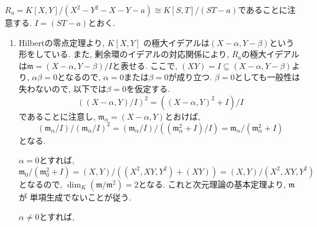 \documentclass[dvipdfmx]{jsarticle}
\begin{document}
    $R_a = K[X, Y]/ (X^2-Y^2-X-Y-a) \cong K[S,T]/(ST-a)$であることに注意する.
    $I = (ST-a)$とおく.
    \begin{enumerate}
        \item Hilbertの零点定理より, $K[X, Y]$
        の極大イデアルは$(X-\alpha, Y-\beta)$という形をしている.
        また, 剰余環のイデアルの対応関係により,
        $R_a$の極大イデアルは$\mathfrak{m} = (X-\alpha, Y-\beta)/I$と表せる.
        ここで, $(XY) = I \subseteq (X-\alpha, Y-\beta)$より,
        $\alpha\beta = 0$となるので, $\alpha = 0$または$\beta = 0$が成り立つ.
        $\beta = 0$としても一般性は失わないので, 以下では$\beta = 0$を仮定する.
        \[
            ((X-\alpha, Y)/I)^2 = ((X-\alpha, Y)^2 + I)/I
        \]
        であることに注意し, $\mathfrak{m}_\alpha = (X-\alpha, Y)$とおけば,
        \[
            (\mathfrak{m}_\alpha/I)/(\mathfrak{m}_\alpha/I)^2 = (\mathfrak{m}_\alpha/I)/((\mathfrak{m}_\alpha^2+I)/I) = \mathfrak{m}_\alpha/(\mathfrak{m}_\alpha^2 + I)
        \]
        となる.

        $\alpha = 0$とすれば,
        \[
            \mathfrak{m}_0/(\mathfrak{m}_0^2 + I) = (X,Y)/((X^2, XY, Y^2) + (XY)) = (X,Y)/(X^2, XY, Y^2)
        \]
        となるので, $\dim_K(\mathfrak{m}/\mathfrak{m}^2) = 2$となる.
        これと次元理論の基本定理より, $\mathfrak{m}$が
        単項生成でないことが従う.

        $\alpha \neq 0$とすれば,
    \end{enumerate}
\end{document}

